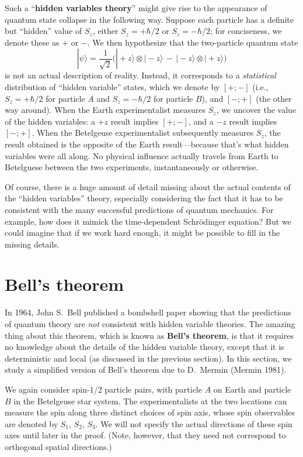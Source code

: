 \documentclass[pra,11pt]{revtex4}
\begin{document}
Such a ``\textbf{hidden variables theory}'' might give rise to the
appearance of quantum state collapse in the following way.  Suppose
each particle has a definite but ``hidden'' value of $S_z$, either
$S_z = +\hbar/2$ or $S_z = -\hbar/2$; for conciseness, we denote these
as $+$ or $-$.  We then hypothesize that the two-particle quantum state
$$|\psi\rangle = \frac{1}{\sqrt{2}} \Big(|\!+\!z\rangle\otimes|\!-\!z\rangle \,-\, |\!-\!z\rangle\otimes|\!+\!z\rangle\Big)$$
is not an actual description of reality.  Instead, it corresponds to a
\textit{statistical} distribution of ``hidden variable'' states, which
we denote by $[+;-]$ (i.e., $S_z = +\hbar/2$ for particle $A$ and $S_z
= -\hbar/2$ for particle $B$), and $[-;+]$ (the other way around).
When the Earth experimentalist measures $S_z$, we uncover the value of
the hidden variables: a $+z$ result implies $[+;-]$, and a $-z$ result
implies $[-;+]$.  When the Betelgeuse experimentalist subsequently
measures $S_z$, the result obtained is the opposite of the Earth
result---because that's what hidden variables were all along.  No
physical influence actually travels from Earth to Betelguese between
the two experiments, instantaneously or otherwise.

Of course, there is a huge amount of detail missing about the actual
contents of the ``hidden variables'' theory, especially considering
the fact that it has to be consistent with the many successful
predictions of quantum mechanics.  For example, how does it mimick the
time-dependent Schr\"odinger equation?  But we could imagine that if
we work hard enough, it might be possible to fill in the missing
details.

\section{Bell's theorem}

In 1964, John S.~Bell published a bombshell paper showing that the
predictions of quantum theory are \textit{not} consistent with hidden
variable theories.  The amazing thing about this theorem, which is
known as \textbf{Bell's theorem}, is that it requires no knowledge
about the details of the hidden variable theory, except that it is
deterministic and local (as discussed in the previous section).  In
this section, we study a simplified version of Bell's theorem due to
D.~Mermin (Mermin 1981).

We again consider spin-1/2 particle pairs, with particle $A$ on Earth
and particle $B$ in the Betelgeuse star system.  The experimentalists
at the two locations can measure the spin along three distinct choices
of spin axis, whose spin observables are denoted by $S_1$, $S_2$,
$S_3$.  We will not specify the actual directions of these spin axes
until later in the proof.  (Note, however, that they need not
correspond to orthogonal spatial directions.)
\end{document}
